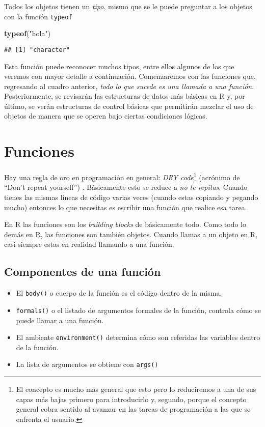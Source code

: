\documentclass[]{article}
\newenvironment{Shaded}{\begin{snugshade}}{\end{snugshade}}
\newcommand{\KeywordTok}[1]{\textcolor[rgb]{0.13,0.29,0.53}{\textbf{#1}}}
\newcommand{\StringTok}[1]{\textcolor[rgb]{0.31,0.60,0.02}{#1}}
\newcommand{\NormalTok}[1]{#1}
\providecommand{\tightlist}{%
  \setlength{\itemsep}{0pt}\setlength{\parskip}{0pt}}
\let\rmarkdownfootnote\footnote%
\def\footnote{\protect\rmarkdownfootnote}
\begin{document}
Todos los objetos tienen un \emph{tipo}, mismo que se le puede preguntar
a los objetos con la función \texttt{typeof}

\begin{Shaded}
\begin{Highlighting}[]
\KeywordTok{typeof}\NormalTok{(}\StringTok{"hola"}\NormalTok{)}
\end{Highlighting}
\end{Shaded}

\begin{verbatim}
## [1] "character"
\end{verbatim}

Esta función puede reconocer muchos tipos, entre ellos algunos de los
que veremos con mayor detalle a continuación. Comenzaremos con las
funciones que, regresando al cuadro anterior, \emph{todo lo que sucede
es una llamada a una función}. Posteriormente, se revisarán las
estructuras de datos más básicas en R y, por último, se verán
estructuras de control básicas que permitirán mezclar el uso de objetos
de manera que se operen bajo ciertas condiciones lógicas.

\section{Funciones}\label{funciones}

Hay una regla de oro en programación en general: \emph{DRY
code}\footnote{El concepto es mucho más general que esto pero lo
  reduciremos a una de sus capas más bajas primero para introducirlo y,
  segundo, porque el concepto general cobra sentido al avanzar en las
  tareas de programación a las que se enfrenta el usuario.} (acrónimo de
``Don't repeat yourself'') \parencite{hunt2000}. Básicamente esto se
reduce a \emph{no te repitas}. Cuando tienes las mismas líneas de código
varias veces (cuando estas copiando y pegando mucho) entonces lo que
necesitas es escribir una función que realice esa tarea.

En R las funciones son los \emph{building blocks} de básicamente todo.
Como todo lo demás en R, las funciones son también objetos. Cuando
llamas a un objeto en R, casi siempre estas en realidad llamando a una
función.

\subsection{Componentes de una
función}\label{componentes-de-una-funcion}

\begin{itemize}
\tightlist
\item
  El \texttt{body()} o cuerpo de la función es el código dentro de la
  misma.
\item
  \texttt{formals()} o el listado de argumentos formales de la función,
  controla cómo se puede llamar a una función.
\item
  El ambiente \texttt{environment()} determina cómo son referidas las
  variables dentro de la función.
\item
  La lista de argumentos se obtiene con \texttt{args()}
\end{itemize}
\end{document}
